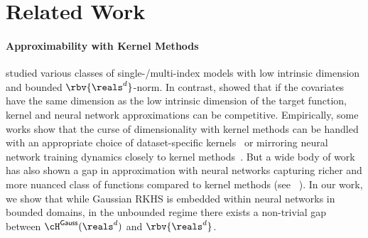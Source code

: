 \section{Related Work}
\paragraph{Approximability with Kernel Methods}

\cite{bach_curse} studied various classes of single-/multi-index models with low intrinsic dimension and bounded $\rbv{\reals^d}$-norm. In contrast, \cite{ghorbani2019limitations} showed that if the covariates have the same dimension as the low intrinsic dimension of the target function, kernel and neural network approximations can be competitive. Empirically, some works show that the curse of dimensionality with kernel methods can be handled with an appropriate choice of dataset-specific kernels~\citep{arora2019harnessing, novak2018bayesian, shankar2020neural} or mirroring neural network training dynamics closely to kernel methods~\citep{mean_field_songmei, sirignano2020mean, rotskoff2022trainability, chizat2018global}. 
But a wide body of work has also shown a gap in approximation with neural networks capturing richer and more nuanced class of functions compared to kernel methods (see ~\citep{allen2019can,mean_field_songmei, yehudai2019power, ghorbani2019limitations}). In our work, we show that while Gaussian RKHS is embedded within neural networks in bounded domains, in the unbounded regime there exists a non-trivial gap between $\cH^{\sf{Gauss}}(\reals^d)$ and $\rbv{\reals^d}$.%

